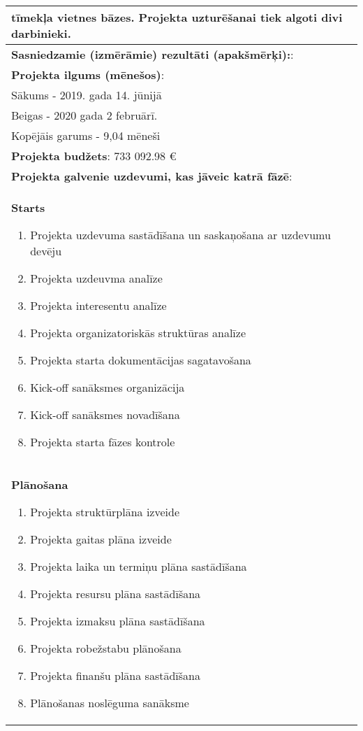 \begin{longtable}{|p{}|}
        tīmekļa vietnes bāzes. Projekta uzturēšanai tiek algoti divi darbinieki.\\
      \hline
        \textbf{Sasniedzamie (izmērāmie) rezultāti (apakšmērķi):}: \\
      \hline
        \textbf{Projekta ilgums (mēnešos)}: \\
          Sākums - 2019. gada 14. jūnijā \\
          Beigas - 2020 gada 2 februārī. \\
          Kopējāis garums -  9,04 mēneši \\
      \hline
        \textbf{Projekta budžets}: 733 092.98 €\\
      \hline
        \textbf{Projekta galvenie uzdevumi, kas jāveic katrā fāzē}: \\
      \hline
        \textbf{Starts}
        \begin{enumerate}
          \item Projekta uzdevuma sastādīšana un saskaņošana ar uzdevumu devēju
          \item Projekta uzdeuvma analīze
          \item Projekta interesentu analīze
          \item Projekta organizatoriskās struktūras analīze
          \item Projekta starta dokumentācijas sagatavošana
          \item Kick-off sanāksmes organizācija
          \item Kick-off sanāksmes novadīšana
          \item Projekta starta fāzes kontrole
        \end{enumerate}\\
      \hline
        \textbf{Plānošana}
        \begin{enumerate}
          \item Projekta struktūrplāna izveide
          \item Projekta gaitas plāna izveide
          \item Projekta laika un termiņu plāna sastādīšana
          \item Projekta resursu plāna sastādīšana
          \item Projekta izmaksu plāna sastādīšana
          \item Projekta robežstabu plānošana
          \item Projekta finanšu plāna sastādīšana
          \item Plānošanas noslēguma sanāksme

\end{enumerate}
\end{longtable}
